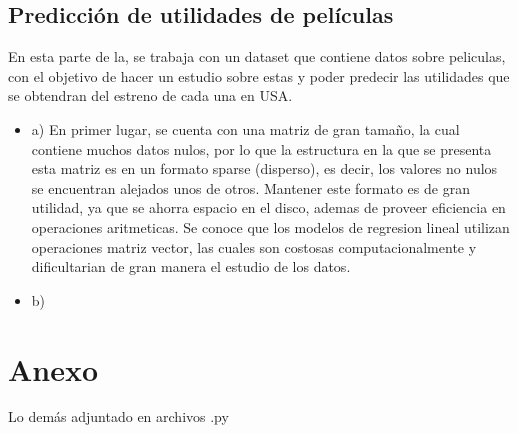 \documentclass[10pt]{article}
\begin{document}
\subsection{Predicción de utilidades de películas}

En esta parte de la, se trabaja con un dataset que contiene datos sobre peliculas, con el objetivo de hacer un estudio sobre estas y poder predecir las utilidades que se obtendran del estreno de cada una en USA. 

\begin{itemize}

\item a) En primer lugar, se cuenta con una matriz de gran tamaño, la cual contiene muchos datos nulos, por lo que la estructura en la que se presenta esta matriz es en un formato sparse (disperso), es decir, los valores no nulos se encuentran alejados unos de otros. Mantener este formato es de gran utilidad, ya que se ahorra espacio en el disco, ademas de proveer eficiencia en operaciones aritmeticas. Se conoce que los modelos de regresion lineal utilizan operaciones matriz vector, las cuales son costosas computacionalmente y dificultarian de gran manera el estudio de los datos.

\item b)


\end{itemize}


 
\section{Anexo}

%

Lo demás adjuntado en archivos .py




\end{document}

